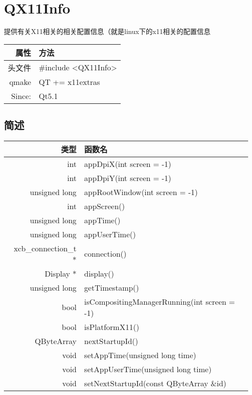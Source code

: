 \chapter{QX11Info}

提供有关X11相关的相关配置信息（就是linux下的x11相关的配置信息


\begin{tabular}{|r|l|}
	\hline
	属性     & 方法                   \\
	\hline
	头文件    & \#include <QX11Info> \\
	\hline
	qmake  & QT += x11extras      \\
	\hline
	Since: & Qt5.1                \\
	\hline
\end{tabular}


\section{简述}

\begin{tabular}{|r|l|}
	\hline
	类型                   & 函数名                                          \\
	\hline
	int                  & appDpiX(int screen = -1)                     \\
	\hline
	int                  & appDpiY(int screen = -1)                     \\
	\hline
	unsigned long        & appRootWindow(int screen = -1)               \\
	\hline
	int                  & appScreen()                                  \\
	\hline
	unsigned long        & appTime()                                    \\
	\hline
	unsigned long        & appUserTime()                                \\
	\hline
	xcb\_connection\_t * & connection()                                 \\
	\hline
	Display *            & display()                                    \\
	\hline
	unsigned long        & getTimestamp()                               \\
	\hline
	bool                 & isCompositingManagerRunning(int screen = -1) \\
	\hline
	bool                 & isPlatformX11()                              \\
	\hline
	QByteArray           & nextStartupId()                              \\
	\hline
	void                 & setAppTime(unsigned long time)               \\
	\hline
	void                 & setAppUserTime(unsigned long time)           \\
	\hline
	void                 & setNextStartupId(const QByteArray \&id)      \\
	\hline
\end{tabular}

